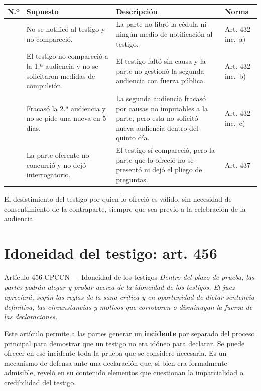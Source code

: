 \documentclass[12pt,oneside]{book}
\renewcommand{\arraystretch}{1.15}
\begin{document}
\begin{center}
\renewcommand{\arraystretch}{1.3}
\begin{tabularx}{\textwidth}{
    >{\centering\arraybackslash}p{}
    >{\raggedright\arraybackslash}X
    >{\raggedright\arraybackslash}X
    >{\raggedright\arraybackslash}p{}}
\toprule
\textbf{N.º} & \textbf{Supuesto} & \textbf{Descripción} & \textbf{Norma} \\
\midrule
1 & No se notificó al testigo y no compareció. & La parte no libró la cédula ni ningún medio de notificación al testigo. & Art. 432 inc.~a) \\
\addlinespace
2 & El testigo no compareció a la 1.ª audiencia y no se solicitaron medidas de compulsión. & El testigo faltó sin causa y la parte no gestionó la segunda audiencia con fuerza pública. & Art. 432 inc.~b) \\
\addlinespace
3 & Fracasó la 2.ª audiencia y no se pide una nueva en 5 días. & La segunda audiencia fracasó por causas no imputables a la parte, pero esta no solicitó nueva audiencia dentro del quinto día. & Art. 432 inc.~c) \\
\addlinespace
4 & La parte oferente no concurrió y no dejó interrogatorio. & El testigo sí compareció, pero la parte que lo ofreció no se presentó ni dejó el pliego de preguntas. & Art. 437 \\
\bottomrule
\end{tabularx}
\end{center}

El desistimiento del testigo por quien lo ofreció es válido, sin necesidad de consentimiento de la contraparte, siempre que sea previo a la celebración de la audiencia.

\section{Idoneidad del testigo: art. 456}

\begin{norma}{Artículo 456 CPCCN --- Idoneidad de los testigos}
\textit{Dentro del plazo de prueba, las partes podrán alegar y probar acerca de la idoneidad de los testigos. El juez apreciará, según las reglas de la sana crítica y en oportunidad de dictar sentencia definitiva, las circunstancias y motivos que corroboren o disminuyan la fuerza de las declaraciones.}
\end{norma}

Este artículo permite a las partes generar un \textbf{incidente} por separado del proceso principal para demostrar que un testigo no era idóneo para declarar. Se puede ofrecer en ese incidente toda la prueba que se considere necesaria. Es un mecanismo de defensa ante una declaración que, si bien era formalmente admisible, reveló en su contenido elementos que cuestionan la imparcialidad o credibilidad del testigo.
\end{document}
